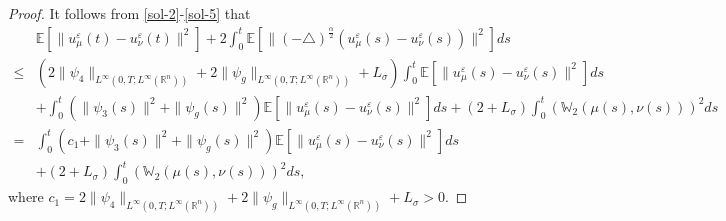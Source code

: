 \documentclass[11pt]{article}
\numberwithin{equation}{section}
\theoremstyle{plain}
\def\leq{\leqslant}
\begin{document}
\begin{proof}
 It follows from \eqref{sol-2}-\eqref{sol-5} that
 \begin{align}\label{sol-6}
      & \mathbb{E}
          \left[ \| u_\mu^\varepsilon(t) - u_\nu^\varepsilon(t) \|^2
          \right]
        + 2 \int_0^t
                 \mathbb{E}
                         \left[
                                \| (-\triangle)^{\frac{\alpha}{2}}
                                    \left( u_\mu^\varepsilon(s)
                                           - u_\nu^\varepsilon(s)
                                    \right)
                                \|^2
                         \right] ds  \nonumber \\
  \leq & \left( 2 \| \psi_4 \|_{L^\infty(0,T; L^\infty(\mathbb{R}^n) ) }
                + 2 \| \psi_g \|_{L^\infty(0,T; L^\infty(\mathbb{R}^n) ) }
                + L_\sigma
         \right)
           \int_0^t \mathbb{E}
                      \left[ \| u_\mu^\varepsilon (s)
                             - u_\nu^\varepsilon (s) \|^2
                      \right] ds  \nonumber \\
       & + \int_0^t
                   \left( \| \psi_3(s) \|^2
                          + \| \psi_g(s) \|^2
                   \right)
                    \mathbb{E}
                      \left[ \| u_\mu^\varepsilon (s)
                             - u_\nu^\varepsilon (s) \|^2
                      \right] ds
         + (2 +
          L_\sigma)
           \int_0^t
                    \left( \mathbb{W}_2 \left( \mu(s), \nu(s) \right)
                    \right)^2
            ds  \nonumber \\
     = & \int_0^t
                   \left( c_1
                          + \| \psi_3(s) \|^2
                          + \| \psi_g(s) \|^2
                   \right)
                    \mathbb{E}
                      \left[ \| u_\mu^\varepsilon (s)
                             - u_\nu^\varepsilon (s) \|^2
                      \right] ds  \nonumber \\
      & + (2 + L_\sigma)
           \int_0^t
                    \left( \mathbb{W}_2 \left( \mu(s), \nu(s) \right)
                    \right)^2
            ds,
\end{align}
 where
       $
          c_1 = 2 \| \psi_4 \|_{L^\infty(0,T; L^\infty(\mathbb{R}^n) ) }
                + 2 \| \psi_g \|_{L^\infty(0,T; L^\infty(\mathbb{R}^n) ) }
                + L_\sigma
              > 0.
       $


\end{proof}
\end{document}
